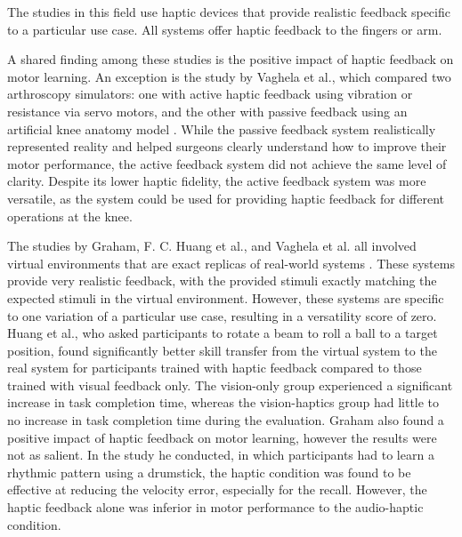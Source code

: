 The studies in this field use haptic devices that provide realistic feedback specific to a particular use case. All systems offer haptic feedback to the fingers or arm.

A shared finding among these studies is the positive impact of haptic feedback on motor learning. An exception is the study by Vaghela et al., which compared two arthroscopy simulators: one with active haptic feedback using vibration or resistance via servo motors, and the other with passive feedback using an artificial knee anatomy model \cite{Vaghela2021}. While the passive feedback system realistically represented reality and helped surgeons clearly understand how to improve their motor performance, the active feedback system did not achieve the same level of clarity. Despite its lower haptic fidelity, the active feedback system was more versatile, as the system could be used for providing haptic feedback for different operations at the knee.

The studies by Graham, F. C. Huang et al., and Vaghela et al. all involved virtual environments that are exact replicas of real-world systems \cite{Graham2008, Huang2006, Vaghela2021}. These systems provide very realistic feedback, with the provided stimuli exactly matching the expected stimuli in the virtual environment. However, these systems are specific to one variation of a particular use case, resulting in a versatility score of zero. Huang et al., who asked participants to rotate a beam to roll a ball to a target position, found significantly better skill transfer from the virtual system to the real system for participants trained with haptic feedback compared to those trained with visual feedback only. The vision-only group experienced a significant increase in task completion time, whereas the vision-haptics group had little to no increase in task completion time during the evaluation. Graham also found a positive impact of haptic feedback on motor learning, however the results were not as salient. In the study he conducted, in which participants had to learn a rhythmic pattern using a drumstick, the haptic condition was found to be effective at reducing the velocity error, especially for the recall. However, the haptic feedback alone was inferior in motor performance to the audio-haptic condition. 

